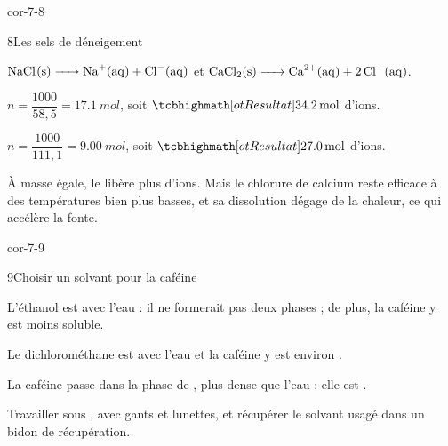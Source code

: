 \begin{blocLivre}{cor-7-8}
\begin{corrige}{8}{Les sels de déneigement}
\begin{questions}
\item $\ce{NaCl(s) -> Na+(aq) + Cl^{-}(aq)}$ et $\ce{CaCl2(s) -> Ca^{2+}(aq) + 2Cl^{-}(aq)}$.
\item $n=\dfrac{1000}{58{,}5}=\qty{17,1}{mol}$, soit $\res{\qty{34,2}{mol}}$ d'ions.
\item $n=\dfrac{1000}{111{,}1}=\qty{9,00}{mol}$, soit $\res{\qty{27,0}{mol}}$ d'ions.
\item À masse égale, le  libère plus d'ions. Mais le chlorure de calcium reste efficace à des
températures bien plus basses, et sa dissolution dégage de la chaleur, ce qui accélère la fonte.
\end{questions}
\end{corrige}
\end{blocLivre}
\begin{blocLivre}{cor-7-9}
\begin{corrige}{9}{Choisir un solvant pour la caféine}
\begin{questions}
\item L'éthanol est  avec l'eau : il ne formerait pas deux phases ; de plus, la caféine y est moins soluble.
\item Le dichlorométhane est  avec l'eau et la caféine y est environ .
\item La caféine passe dans la phase de , plus dense que l'eau : elle est .
\item Travailler sous , avec gants et lunettes, et récupérer le solvant usagé dans un bidon de récupération.
\end{questions}
\end{corrige}
\end{blocLivre}
